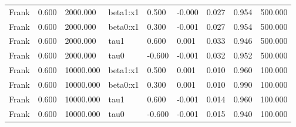 \begin{table}[htbp]
\begin{tabular}{lllllllll}
Frank & 0.600 & 2000.000 & beta1:x1 & 0.500 & -0.000 & 0.027 & 0.954 & 500.000 \\
Frank & 0.600 & 2000.000 & beta0:x1 & 0.300 & -0.001 & 0.027 & 0.954 & 500.000 \\
Frank & 0.600 & 2000.000 & tau1 & 0.600 & 0.001 & 0.033 & 0.946 & 500.000 \\
Frank & 0.600 & 2000.000 & tau0 & -0.600 & -0.001 & 0.032 & 0.952 & 500.000 \\
Frank & 0.600 & 10000.000 & beta1:x1 & 0.500 & 0.001 & 0.010 & 0.960 & 100.000 \\
Frank & 0.600 & 10000.000 & beta0:x1 & 0.300 & 0.001 & 0.010 & 0.990 & 100.000 \\
Frank & 0.600 & 10000.000 & tau1 & 0.600 & -0.001 & 0.014 & 0.960 & 100.000 \\
Frank & 0.600 & 10000.000 & tau0 & -0.600 & -0.001 & 0.015 & 0.940 & 100.000 \\
\hline\end{tabular}\end{table}
